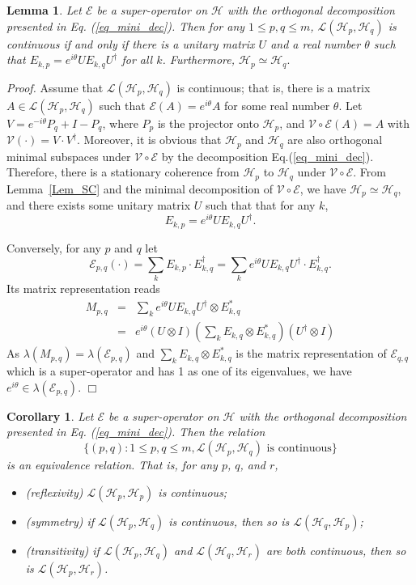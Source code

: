 \documentclass[journal]{IEEEtran}
\def\h{\ensuremath{\mathcal{H}}}
\def\l{\ensuremath{\mathcal{L}}}
\def\v{\ensuremath{\mathcal{V}}}
\def\e{\ensuremath{\mathcal{E}}}
\def\l{\ensuremath{\mathcal{L}}}
\def\l{\mathcal{L}}
\newtheorem{corollary}{Corollary}
\newtheorem{lemma}{Lemma}
\begin{document}
\begin{lemma}\label{lem_block_eq}
  Let $\e$ be a super-operator on $\h$ with the orthogonal decomposition presented in Eq. (\ref{eq_mini_dec}). Then for any $1\leq p, q\leq m$, $\l(\h_p,\h_q)$ is continuous if and only if there is a unitary matrix $U$ and a real number $\theta$ such that 
  $E_{k,p}=e^{i\theta}UE_{k,q}U^\dagger$ for all $k$.
  Furthermore, $\h_p\simeq\h_q.$ 
\end{lemma}
{\it Proof.} 
Assume that $\l(\h_p,\h_q)$ is continuous; that is,  there is a matrix $A\in \l(\h_p,\h_q)$ such that $\e(A)=e^{i\theta}A$ for some real number $\theta$. Let $V=e^{-i\theta}P_q+I-P_q$, where $P_p$ is the projector onto $\h_p$,  and  $\v\circ\e(A)=A$ with $\v(\cdot)=V\cdot V^\dagger$. Moreover, it is obvious that $\h_p$ and $\h_q$ are also orthogonal minimal subspaces under $\v\circ\e$  by the decomposition Eq.(\ref{eq_mini_dec}). Therefore, there is a stationary coherence from $\h_p$ to $\h_q$ under $\v\circ\e.$ From Lemma~\ref{Lem_SC} and the minimal decomposition of $\v\circ\e$, we have $\h_p\simeq\h_q$, and there exists some unitary matrix $U$ such that that for any $k$,
$$E_{k,p}=e^{i\theta}UE_{k,q}U^\dagger.$$ 

Conversely, for any $p$ and $q$ let $$\e_{p,q}(\cdot)=\sum_{k}E_{k,p}\cdot E_{k,q}^\dagger=\sum_{k}e^{i\theta}UE_{k,q}U^\dagger\cdot E_{k,q}^\dagger.$$ 
Its matrix representation \cite{guan2016decomposition} reads
\begin{eqnarray*}
  M_{p,q}&=&\sum_k e^{i\theta}UE_{k,q}U^\dagger\otimes E_{k,q}^{*}\\
  &=&e^{i\theta}(U\otimes I)\left(\sum_k E_{k,q}\otimes E_{k,q}^{*}\right)(U^\dagger\otimes I)
\end{eqnarray*}
As $\lambda(M_{p,q})=\lambda(\e_{p,q})$ and $\sum_k E_{k,q}\otimes E_{k,q}^{*}$ is the matrix representation of $\e_{q,q}$ which is a super-operator and has 1 as one of its eigenvalues, we have $e^{i\theta}\in\lambda(\e_{p,q}).$  
\hfill $\Box$

\begin{corollary}\label{cor_cc_eq}
Let $\e$ be a super-operator on $\h$ with the orthogonal decomposition presented in Eq. (\ref{eq_mini_dec}). 
Then the relation 
$$\{(p, q) : 1\leq p, q\leq m,  \l(\h_p,\h_q)  \mbox{ is continuous}\}$$
 is an equivalence relation. That is,
  for any $p$, $q$, and $r$, \begin{itemize}
    \item [(1)] (reflexivity) $\l(\h_p,\h_p)$ is continuous;
    \item [(2)] (symmetry) if $\l(\h_p,\h_q)$ is continuous, then so is $\l(\h_q,\h_p)$;
    \item [(3)] (transitivity) if $\l(\h_p,\h_q)$ and $\l(\h_q,\h_r)$ are both continuous, then so is $\l(\h_p,\h_r)$.
      \end{itemize}
\end{corollary}
\end{document}

